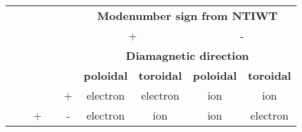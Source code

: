 \documentclass[12pt,a4paper]{article}
\begin{document}
\begin{table}[htb!]
\centering
\label{my-label}
\begin{tabular}{lllll|c|c||c|c|}
\cline{6-9}
                                                     &                                                        &                                          &                                                         &                                 & \multicolumn{4}{c|}{\textbf{Modenumber sign from NTIWT}}                                                                                                          \\ \cline{6-9} 
                                                     &                                                        &                                          &                                                         &                                 & \multicolumn{2}{c||}{+}                                                          & \multicolumn{2}{c|}{-}                                                          \\ \cline{6-9} 
                                                     &                                                        &                                          &                                                         &                                 & \multicolumn{4}{c|}{\textbf{Diamagnetic direction}}                                                                                                               \\ \cline{6-9} 
                                                     &                                                        &                                          &                                                         &                                 & \multicolumn{1}{l|}{\textbf{poloidal}} & \multicolumn{1}{l||}{\textbf{toroidal}} & \multicolumn{1}{l|}{\textbf{poloidal}} & \multicolumn{1}{l|}{\textbf{toroidal}} \\ \hline \hline
\multicolumn{1}{|l|}{}                               & \multicolumn{1}{c|}{}                                  & \multicolumn{1}{c|}{}                    & \multicolumn{1}{c|}{}                                   & \multicolumn{1}{c|}{+}          & electron                               & electron                               & ion                                    & ion                                    \\ \cline{5-9} 
\multicolumn{1}{|l|}{}                               & \multicolumn{1}{c|}{}                                  & \multicolumn{1}{c|}{\multirow{-2}{*}{+}} & \multicolumn{1}{c|}{}                                   & \multicolumn{1}{c|}{-}          & electron                               & ion                                    & ion                                    & electron                               \\ \cline{3-3} \cline{5-9} 

\end{tabular}
\end{table}
\end{document}
